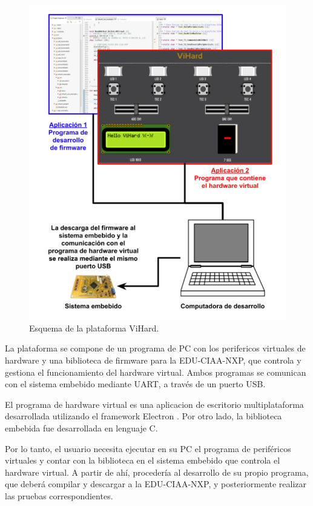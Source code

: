 \begin{figure}[ht]
	\centering
	\includegraphics[scale=.40]{./Figures/ViHard.png}
	\caption{Esquema de la plataforma ViHard.\protect\footnotemark}
	\label{fig:ViHard}
\end{figure}

La plataforma se compone de un programa de PC con los perifericos virtuales de hardware y una biblioteca de firmware para la EDU-CIAA-NXP, que controla y gestiona el funcionamiento del hardware virtual. Ambos programas se comunican con el sistema embebido mediante UART, a través de un puerto USB.

El programa de hardware virtual es una aplicacion de escritorio multiplataforma desarrollada utilizando el framework Electron \citep{Electron}. Por otro lado, la biblioteca embebida fue desarrollada en lenguaje C. 

Por lo tanto, el usuario necesita ejecutar en su PC el programa de periféricos virtuales y contar con la biblioteca en el sistema embebido que controla el hardware virtual. A partir de ahí, procedería al desarrollo de su propio programa, que deberá compilar y descargar a la EDU-CIAA-NXP, y posteriormente realizar las pruebas correspondientes.

